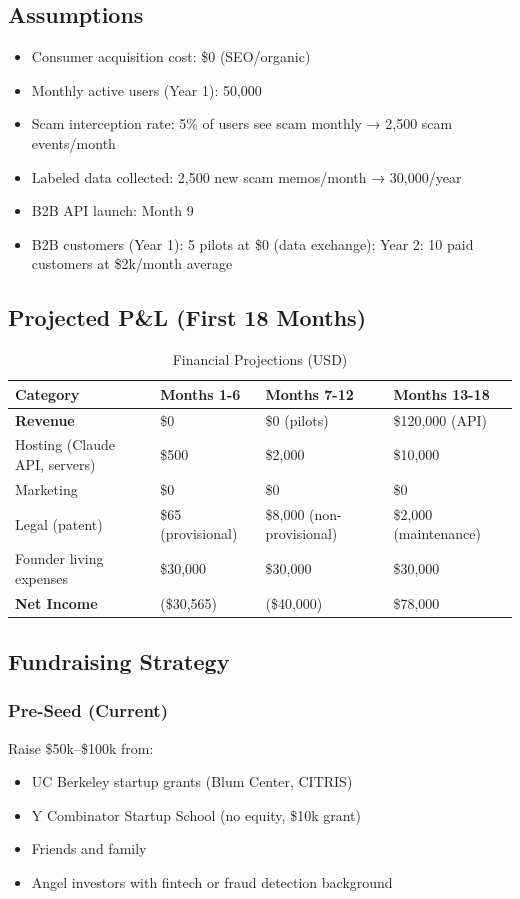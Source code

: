 \documentclass[12pt]{article}
\begin{document}
\subsection{Assumptions}
\begin{itemize}
    \item Consumer acquisition cost: \$0 (SEO/organic)
    \item Monthly active users (Year 1): 50,000
    \item Scam interception rate: 5\% of users see scam monthly → 2,500 scam events/month
    \item Labeled data collected: 2,500 new scam memos/month → 30,000/year
    \item B2B API launch: Month 9
    \item B2B customers (Year 1): 5 pilots at \$0 (data exchange); Year 2: 10 paid customers at \$2k/month average
\end{itemize}

\subsection{Projected P\&L (First 18 Months)}

\begin{table}[H]
\centering
\caption{Financial Projections (USD)}
\begin{tabular}{|l|l|l|l|}
\hline
\textbf{Category} & \textbf{Months 1-6} & \textbf{Months 7-12} & \textbf{Months 13-18} \\
\hline
\textbf{Revenue} & \$0 & \$0 (pilots) & \$120,000 (API) \\
\hline
Hosting (Claude API, servers) & \$500 & \$2,000 & \$10,000 \\
\hline
Marketing & \$0 & \$0 & \$0 \\
\hline
Legal (patent) & \$65 (provisional) & \$8,000 (non-provisional) & \$2,000 (maintenance) \\
\hline
Founder living expenses & \$30,000 & \$30,000 & \$30,000 \\
\hline
\textbf{Net Income} & (\$30,565) & (\$40,000) & \$78,000 \\
\hline
\end{tabular}
\end{table}

\subsection{Fundraising Strategy}

\subsubsection{Pre-Seed (Current)}
Raise \$50k–\$100k from:
\begin{itemize}
    \item UC Berkeley startup grants (Blum Center, CITRIS)
    \item Y Combinator Startup School (no equity, \$10k grant)
    \item Friends and family
    \item Angel investors with fintech or fraud detection background
\end{itemize}
\end{document}
